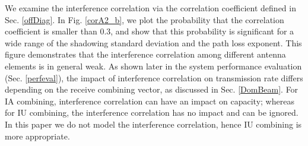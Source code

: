 \documentclass[12pt, draftclsnofoot, onecolumn]{IEEEtran}
\theoremstyle{plain}
\begin{document}
We examine the interference correlation via the correlation coefficient defined in Sec. \ref{offDiag}. {\color{black} In Fig. \ref{corA2_b}, we plot the probability that the correlation coefficient is smaller than 0.3, and show that this probability is significant for a wide range of the shadowing standard deviation and the path loss exponent.}
%
This figure demonstrates that the interference correlation among different antenna elements is in general weak. {\color{black} As shown later in the system performance evaluation (Sec. \ref{perfeval}), the impact of interference correlation on transmission rate differs depending on the receive combining vector, as discussed in Sec. \ref{DomBeam}. For IA combining, interference correlation can have an impact on capacity; whereas for IU combining, the interference correlation has no impact and can be ignored. In this paper we do not model the interference correlation, hence IU combining is more appropriate.}
\iffalse
Hence, we ignore this interference correlation in later system performance evaluation (Sec. \ref{perfeval}), which is once more verified against simulation results and confirms that the interference correlation has negligible effect on capacity. %

{\color{black} Moreover, assuming a receive combining vector as the left singular vector corresponding to the dominant mode of $\mathbf{H}_0$ makes it independent of the interference. Then, the equivalent interference power after combining has the same form as in \eqref{eq25} and the gap between capacity performance curves obtained using the mixture interference power model and simulation becomes insignificant and independent of $N_{UE}$ and $N_{BS}$ as shown in Fig. \ref{Fig::OutageVSelements}.}
\fi
%
\vspace{-.15in}
\end{document}
